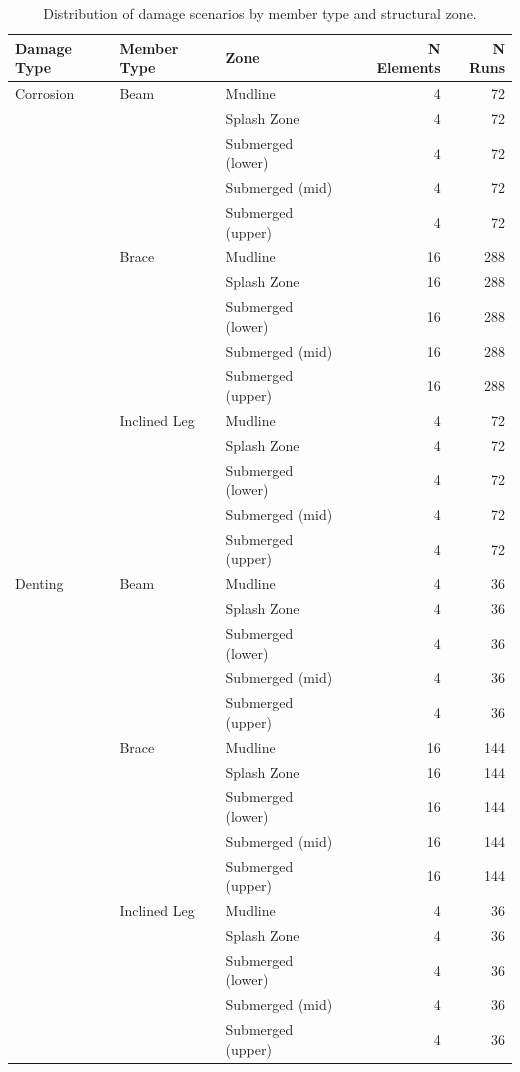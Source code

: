 \begin{table}[H]
  \centering
  \caption{Distribution of damage scenarios by member type and structural zone.}
  \label{tab:desglose_casos}
  \begin{tabular}{llllrr}
    \toprule
    Damage Type & Member Type & Zone & & N Elements & N Runs \\
    \midrule
    Corrosion & Beam & Mudline & & 4 & 72 \\
     &  & Splash Zone & & 4 & 72 \\
     &  & Submerged (lower) & & 4 & 72 \\
     &  & Submerged (mid) & & 4 & 72 \\
     &  & Submerged (upper) & & 4 & 72 \\
     & Brace & Mudline & & 16 & 288 \\
     &  & Splash Zone & & 16 & 288 \\
     &  & Submerged (lower) & & 16 & 288 \\
     &  & Submerged (mid) & & 16 & 288 \\
     &  & Submerged (upper) & & 16 & 288 \\
     & Inclined Leg & Mudline & & 4 & 72 \\
     &  & Splash Zone & & 4 & 72 \\
     &  & Submerged (lower) & & 4 & 72 \\
     &  & Submerged (mid) & & 4 & 72 \\
     &  & Submerged (upper) & & 4 & 72 \\
    \midrule
    Denting & Beam & Mudline & & 4 & 36 \\
     &  & Splash Zone & & 4 & 36 \\
     &  & Submerged (lower) & & 4 & 36 \\
     &  & Submerged (mid) & & 4 & 36 \\
     &  & Submerged (upper) & & 4 & 36 \\
     & Brace & Mudline & & 16 & 144 \\
     &  & Splash Zone & & 16 & 144 \\
     &  & Submerged (lower) & & 16 & 144 \\
     &  & Submerged (mid) & & 16 & 144 \\
     &  & Submerged (upper) & & 16 & 144 \\
     & Inclined Leg & Mudline & & 4 & 36 \\
     &  & Splash Zone & & 4 & 36 \\
     &  & Submerged (lower) & & 4 & 36 \\
     &  & Submerged (mid) & & 4 & 36 \\
     &  & Submerged (upper) & & 4 & 36 \\
    \bottomrule
  \end{tabular}
\end{table}